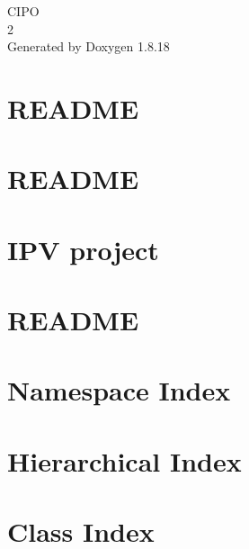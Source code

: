 \let\mypdfximage\pdfximage\def\pdfximage{\immediate\mypdfximage}\documentclass[twoside]{book}
\newcommand{\+}{\discretionary{\mbox{\scriptsize$\hookleftarrow$}}{}{}}
\newcommand{\clearemptydoublepage}{%
  \newpage{\pagestyle{empty}\cleardoublepage}%
}
\begin{document}
\hypersetup{pageanchor=false,
             bookmarksnumbered=true,
             pdfencoding=unicode
            }
\begin{titlepage}
\vspace*{7cm}
\begin{center}%
{\Large C\+I\+PO \\[1ex]\large 2 }\\
\vspace*{1cm}
{\large Generated by Doxygen 1.8.18}\\
\end{center}
\end{titlepage}
\clearemptydoublepage
{}
\tableofcontents
\clearemptydoublepage
{}
\hypersetup{pageanchor=true}

\chapter{R\+E\+A\+D\+ME}
\label{md_models__r_e_a_d_m_e}

\chapter{R\+E\+A\+D\+ME}
\label{md_parsers__r_e_a_d_m_e}

\chapter{I\+PV project}
\label{md__r_e_a_d_m_e}

\chapter{R\+E\+A\+D\+ME}
\label{md_routines__r_e_a_d_m_e}

\chapter{Namespace Index}

\chapter{Hierarchical Index}

\chapter{Class Index}

\end{document}
